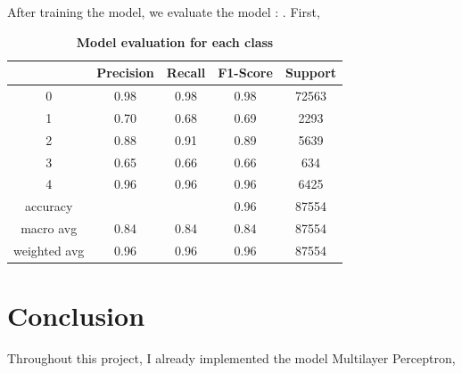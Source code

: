 \documentclass{article}
\begin{document}
After training the model, we evaluate the model : . First,

\begin{table}[ht]
\centering
\begin{tabular}{|c|cccc|}
\hline
\multicolumn{1}{|c|}{} & Precision & Recall & F1-Score & Support \\ \hline
0 & 0.98 & 0.98 & 0.98 & 72563 \\ \hline
1 & 0.70 & 0.68 & 0.69 & 2293 \\ \hline
2 & 0.88 & 0.91 & 0.89 & 5639 \\ \hline
3 & 0.65 & 0.66 & 0.66 & 634 \\ \hline
4 & 0.96 & 0.96 & 0.96 & 6425 \\ \hline
accuracy &  &  & 0.96 & 87554 \\ \hline
macro avg & 0.84 & 0.84 & 0.84 & 87554 \\ \hline
weighted avg & 0.96 & 0.96 & 0.96 & 87554 \\ \hline
\end{tabular}
\caption{\textbf{Model evaluation for each class}}
\label{tab:my_table} %
\end{table}


\section{Conclusion}
Throughout this project, I already implemented the model Multilayer Perceptron,  

\end{document}
